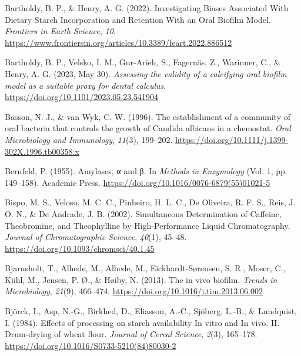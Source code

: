 \documentclass[
  letterpaper,
]{book}
\newlength{\cslhangindent}
\newlength{\cslentryspacingunit} %
\newenvironment{CSLReferences}[2] %
 {%
  \setlength{\parindent}{0pt}
  \ifodd #1
  \let\oldpar\par
  \def\par{\hangindent=\cslhangindent\oldpar}
  \fi
  \setlength{\parskip}{#2\cslentryspacingunit}
 }%
 {}
\begin{document}
\begin{CSLReferences}{1}{0}
\leavevmode{}%
Bartholdy, B. P., \& Henry, A. G. (2022). Investigating {Biases
Associated With Dietary Starch Incorporation} and {Retention With} an
{Oral Biofilm Model}. \emph{Frontiers in Earth Science}, \emph{10}.
\url{https://www.frontiersin.org/articles/10.3389/feart.2022.886512}

\leavevmode{}%
Bartholdy, B. P., Velsko, I. M., Gur-Arieh, S., Fagernäs, Z., Warinner,
C., \& Henry, A. G. (2023, May 30). \emph{Assessing the validity of a
calcifying oral biofilm model as a suitable proxy for dental calculus}.
\url{https://doi.org/10.1101/2023.05.23.541904}

\leavevmode{}%
Basson, N. J., \& van Wyk, C. W. (1996). The establishment of a
community of oral bacteria that controls the growth of {Candida}
albicans in a chemostat. \emph{Oral Microbiology and Immunology},
\emph{11}(3), 199--202.
\url{https://doi.org/10.1111/j.1399-302X.1996.tb00358.x}

\leavevmode{}%
Bernfeld, P. (1955). Amylases, α and β. In \emph{Methods in
{Enzymology}} (Vol. 1, pp. 149--158). {Academic Press}.
\url{https://doi.org/10.1016/0076-6879(55)01021-5}

\leavevmode{}%
Bispo, M. S., Veloso, M. C. C., Pinheiro, H. L. C., De Oliveira, R. F.
S., Reis, J. O. N., \& De Andrade, J. B. (2002). Simultaneous
{Determination} of {Caffeine}, {Theobromine}, and {Theophylline} by
{High-Performance Liquid Chromatography}. \emph{Journal of
Chromatographic Science}, \emph{40}(1), 45--48.
\url{https://doi.org/10.1093/chromsci/40.1.45}

\leavevmode{}%
Bjarnsholt, T., Alhede, M., Alhede, M., Eickhardt-Sørensen, S. R.,
Moser, C., Kühl, M., Jensen, P. Ø., \& Høiby, N. (2013). The in vivo
biofilm. \emph{Trends in Microbiology}, \emph{21}(9), 466--474.
\url{https://doi.org/10.1016/j.tim.2013.06.002}

\leavevmode{}%
Björck, I., Asp, N.-G., Birkhed, D., Eliasson, A.-C., Sjöberg, L.-B., \&
Lundquist, I. (1984). Effects of processing on starch availability {In}
vitro and {In} vivo. {II}. {Drum-drying} of wheat flour. \emph{Journal
of Cereal Science}, \emph{2}(3), 165--178.
\url{https://doi.org/10.1016/S0733-5210(84)80030-2}


\end{CSLReferences}
\end{document}

